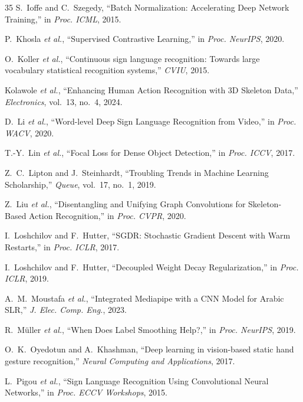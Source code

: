 \documentclass[conference]{IEEEtran}
\begin{document}
\begin{thebibliography}{35}
S.~Ioffe and C.~Szegedy, ``Batch Normalization: Accelerating Deep Network Training,'' in \textit{Proc. ICML}, 2015.

P.~Khosla \textit{et al.}, ``Supervised Contrastive Learning,'' in \textit{Proc. NeurIPS}, 2020.

O.~Koller \textit{et al.}, ``Continuous sign language recognition: Towards large vocabulary statistical recognition systems,'' \textit{CVIU}, 2015.

Kolawole \textit{et al.}, ``Enhancing Human Action Recognition with 3D Skeleton Data,'' \textit{Electronics}, vol.~13, no.~4, 2024.

D.~Li \textit{et al.}, ``Word-level Deep Sign Language Recognition from Video,'' in \textit{Proc. WACV}, 2020.

T.-Y.~Lin \textit{et al.}, ``Focal Loss for Dense Object Detection,'' in \textit{Proc. ICCV}, 2017.

Z.~C.~Lipton and J.~Steinhardt, ``Troubling Trends in Machine Learning Scholarship,'' \textit{Queue}, vol.~17, no.~1, 2019.

Z.~Liu \textit{et al.}, ``Disentangling and Unifying Graph Convolutions for Skeleton-Based Action Recognition,'' in \textit{Proc. CVPR}, 2020.

I.~Loshchilov and F.~Hutter, ``SGDR: Stochastic Gradient Descent with Warm Restarts,'' in \textit{Proc. ICLR}, 2017.

I.~Loshchilov and F.~Hutter, ``Decoupled Weight Decay Regularization,'' in \textit{Proc. ICLR}, 2019.

A.~M.~Moustafa \textit{et al.}, ``Integrated Mediapipe with a CNN Model for Arabic SLR,'' \textit{J. Elec. Comp. Eng.}, 2023.

R.~M\"{u}ller \textit{et al.}, ``When Does Label Smoothing Help?,'' in \textit{Proc. NeurIPS}, 2019.

O.~K.~Oyedotun and A.~Khashman, ``Deep learning in vision-based static hand gesture recognition,'' \textit{Neural Computing and Applications}, 2017.

L.~Pigou \textit{et al.}, ``Sign Language Recognition Using Convolutional Neural Networks,'' in \textit{Proc. ECCV Workshops}, 2015.


\end{thebibliography}
\end{document}

